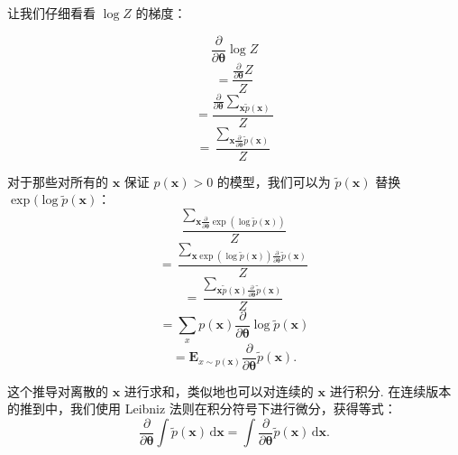 让我们仔细看看 $\log Z$ 的梯度：

\begin{equation}  \label{eq:pyth}
\frac{\partial}{\partial \pmb{\theta}} \log Z
\end{equation}
\begin{equation}  \label{eq:pyth}
=\frac{\frac{\partial}{\partial \pmb{\theta}} Z}{Z}
\end{equation}
\begin{equation}  \label{eq:pyth}
=\frac{\frac{\partial}{\partial \pmb{\theta}} \sum_{\mathbf{x} \tilde{p}(\mathbf{x})}}{Z}
\end{equation}
\begin{equation}  \label{eq:pyth}
=\frac{\sum_{\mathbf{x} \frac{\partial}{\partial \pmb{\theta}} \tilde{p}(\mathbf{x})}}{Z}
\end{equation}

对于那些对所有的 $\mathbf{x}$ 保证 $p(\mathbf{x}) > 0$ 的模型，我们可以为 $\tilde{p}(\mathbf{x})$ 替换 $\exp(\log \tilde{p}(\mathbf{x})$：
\begin{equation}  \label{eq:pyth}
\frac{\sum_{\mathbf{x} \frac{\partial}{\partial \pmb{\theta}} \exp(\log \tilde{p}(\mathbf{x}))}}{Z}
\end{equation}
\begin{equation}  \label{eq:pyth}
=\frac{\sum_{\mathbf{x} \exp(\log\tilde{p}(\mathbf{x})) \frac{\partial}{\partial \pmb{\theta}} \tilde{p}(\mathbf{x})}}{Z}
\end{equation}
\begin{equation}  \label{eq:pyth}
=\frac{\sum_{\mathbf{x} \tilde{p}(\mathbf{x}) \frac{\partial}{\partial \pmb{\theta}} \tilde{p}(\mathbf{x})}}{Z}
\end{equation}
\begin{equation}  \label{eq:pyth}
=\sum_{x}p(\mathbf{x}) \frac{\partial}{\partial \pmb{\theta}} \log \tilde{p}(\mathbf{x})
\end{equation}
\begin{equation}  \label{eq:pyth}
=\mathbf{E}_{x\sim p(\mathbf{x})} \frac{\partial}{\partial \pmb{\theta}} \tilde{p}(\mathbf{x}).
\end{equation}

这个推导对离散的 $\pmb{x}$ 进行求和，类似地也可以对连续的 $\pmb{x}$ 进行积分. 在连续版本的推到中，我们使用 Leibniz 法则在积分符号下进行微分，获得等式：
\begin{equation}  \label{eq:pyth}
\frac{\partial}{\partial \pmb{\theta}} \int \!\tilde{p}(\mathbf{x}) \, \mathrm{d}\pmb{x} = \int \!\frac{\partial}{\partial \pmb{\theta}} \tilde{p}(\pmb{x}) \,\mathrm{d}\pmb{x}.
\end{equation}

